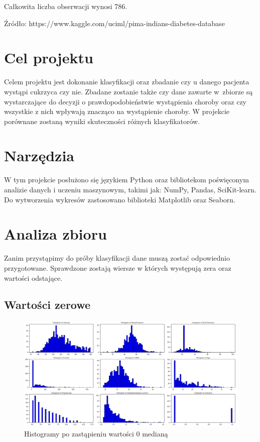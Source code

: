 \documentclass[12pt]{article}
\begin{document}
Całkowita liczba obserwacji wynosi 786.

Źródło: https://www.kaggle.com/uciml/pima-indians-diabetes-database


\pagebreak
\section{Cel projektu}

Celem projektu jest dokonanie klasyfikacji oraz zbadanie czy u danego pacjenta wystąpi cukrzyca czy nie. Zbadane zostanie także czy dane zawarte w~zbiorze są wystarczające do decyzji o prawdopodobieństwie wystąpienia choroby oraz czy wszystkie z nich wpływają znacząco na wystąpienie choroby.
W projekcie porównane zostaną wyniki skuteczności różnych klasyfikatorów.

\section{Narzędzia}
	W tym projekcie posłużono się językiem Python oraz bibliotekom poświęconym analizie danych i uczeniu maszynowym, takimi jak: NumPy, Pandas, SciKit-learn. Do wytworzenia wykresów zastosowano biblioteki Matplotlib oraz Seaborn.


\section{Analiza zbioru}

Zanim przystąpimy do próby klasyfikacji dane muszą zostać odpowiednio przygotowane. Sprawdzone zostają wiersze w których występują zera oraz wartości odstające.

\subsection{Wartości zerowe}

\begin{figure}
	\centering
	\includegraphics[width=1.2\textwidth]{images/hist_median.png}
	\caption{Histogramy po zastąpieniu wartości 0 medianą}
	\label{fig:outliers}
\end{figure}
\end{document}

